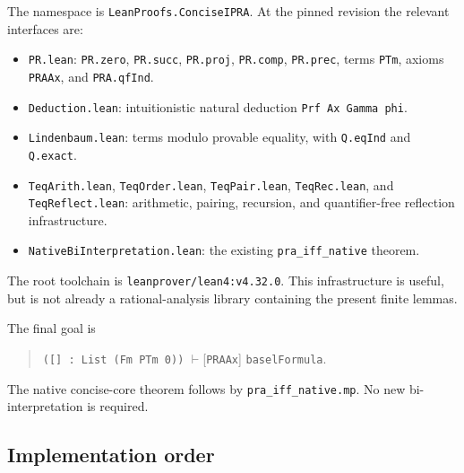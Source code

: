 \documentclass[11pt,a4paper]{article}
\theoremstyle{remark}\newtheorem{remark}[theorem]{Remark}
\begin{document}
The namespace is \texttt{LeanProofs.ConciseIPRA}. At the pinned
revision the relevant interfaces are:
\begin{itemize}
\item \texttt{PR.lean}: \texttt{PR.zero}, \texttt{PR.succ},
\texttt{PR.proj}, \texttt{PR.comp}, \texttt{PR.prec},
terms \texttt{PTm}, axioms \texttt{PRAAx}, and
\texttt{PRA.qfInd}.
\item \texttt{Deduction.lean}: intuitionistic natural deduction
\texttt{Prf Ax Gamma phi}.
\item \texttt{Lindenbaum.lean}: terms modulo provable equality,
with \texttt{Q.eqInd} and \texttt{Q.exact}.
\item \texttt{TeqArith.lean}, \texttt{TeqOrder.lean},
\texttt{TeqPair.lean}, \texttt{TeqRec.lean}, and
\texttt{TeqReflect.lean}: arithmetic, pairing, recursion, and
quantifier-free reflection infrastructure.
\item \texttt{NativeBiInterpretation.lean}: the existing
\texttt{pra\_iff\_native} theorem.
\end{itemize}
The root toolchain is \texttt{leanprover/lean4:v4.32.0}.
This infrastructure is useful, but is not already a rational-analysis
library containing the present finite lemmas.

The final goal is
\begin{quote}\small
\texttt{([] : List (Fm PTm 0))} $\vdash$[\texttt{PRAAx}]
\texttt{baselFormula}.
\end{quote}
The native concise-core theorem follows by
\texttt{pra\_iff\_native.mp}. No new bi-interpretation is required.

\subsection{Implementation order}
\end{document}
